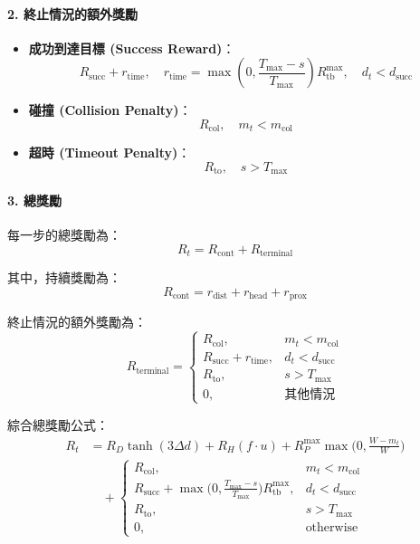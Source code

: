 \documentclass[12pt,a4paper]{article}
\begin{document}
\paragraph{2. 終止情況的額外獎勵}
\begin{itemize}
    \item \textbf{成功到達目標 (Success Reward)}：
    \[
    R_{\text{succ}} + r_{\text{time}}, \quad
    r_{\text{time}} = \max\!\left(0, \frac{T_{\max}-s}{T_{\max}}\right) R_{\text{tb}}^{\max}, \quad d_t<d_{\text{succ}}
    \]
    \item \textbf{碰撞 (Collision Penalty)}：
    \[
    R_{\text{col}}, \quad m_t < m_{\text{col}}
    \]
    \item \textbf{超時 (Timeout Penalty)}：
    \[
    R_{\text{to}}, \quad s > T_{\max}
    \]
\end{itemize}

\paragraph{3. 總獎勵}
每一步的總獎勵為：
\[
R_t = R_{\text{cont}} + R_{\text{terminal}}
\]

其中，持續獎勵為：
\[
R_{\text{cont}} = r_{\text{dist}} + r_{\text{head}} + r_{\text{prox}}
\]

終止情況的額外獎勵為：
\[
R_{\text{terminal}} =
\begin{cases}
R_{\text{col}}, & m_t < m_{\text{col}} \\
R_{\text{succ}} + r_{\text{time}}, & d_t < d_{\text{succ}} \\
R_{\text{to}}, & s > T_{\max} \\
0, & \text{其他情況}
\end{cases}
\]

綜合總獎勵公式：
\[
\begin{aligned}
R_t &= R_D \tanh(3 \Delta d) + R_H (f \cdot u) + R_P^{\max} \max\!\Big(0,\frac{W-m_t}{W}\Big) \\
&\quad +
\begin{cases}
R_{\text{col}}, & m_t < m_{\text{col}}\\
R_{\text{succ}} + \displaystyle \max\!\Big(0,\frac{T_{\max}-s}{T_{\max}}\Big) R_{\text{tb}}^{\max}, & d_t < d_{\text{succ}}\\
R_{\text{to}}, & s > T_{\max}\\
0, & \text{otherwise}
\end{cases}
\end{aligned}
\]

\newpage
\end{document}
